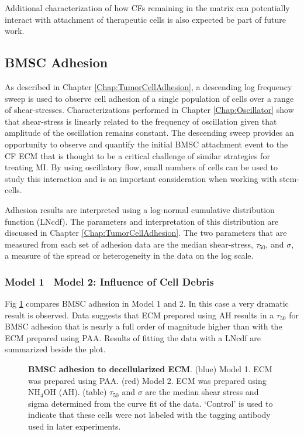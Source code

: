 Additional characterization of how CFs remaining in the matrix can potentially interact with attachment of therapeutic cells is also expected be part of future work.

\subsection{BMSC Adhesion}
As described in Chapter \ref{Chap:TumorCellAdhesion}, a descending log frequency sweep is used to observe cell adhesion of a single population of cells over a range of shear-stresses. Characterizations performed in Chapter \ref{Chap:Oscillator} show that shear-stress is linearly related to the frequency of oscillation given that amplitude of the oscillation remains constant. The descending sweep provides an opportunity to observe and quantify the initial BMSC attachment event to the CF ECM that is thought to be a critical challenge of similar strategies for treating MI. By using oscillatory flow, small numbers of cells can be used to study this interaction and is an important consideration when working with stem-cells.

Adhesion results are interpreted using a log-normal cumulative distribution function (LNcdf). The parameters and interpretation of this distribution are discussed in Chapter \ref{Chap:TumorCellAdhesion}. The two parameters that are measured from each set of adhesion data are the median shear-stress, $\tau_{50}$, and $\sigma$, a measure of the spread or heterogeneity in the data on the log scale.

\subsubsection{Model 1 \vs\ Model 2: Influence of Cell Debris}
Fig \ref{Chap:Cardiac:fig:1v2} compares BMSC adhesion in Model 1 and 2. In this case a very dramatic result is observed. Data suggests that ECM prepared using AH results in a $\tau_{50}$ for BMSC adhesion that is nearly a full order of magnitude higher than with the ECM prepared using PAA. Results of fitting the data with a LNcdf are summarized beside the plot.
\begin{figure}[!t]
\centering
{}
\caption{\textbf{BMSC adhesion to decellularized ECM}. (blue) Model 1. ECM was prepared using PAA. (red) Model 2. ECM was prepared using NH$_{4}$OH (AH). (table) $\tau_{50}$ and $\sigma$ are the median shear stress and sigma determined from the curve fit of the data. `Control' is used to indicate that these cells were not labeled with the tagging antibody used in later experiments.}
\label{Chap:Cardiac:fig:1v2}
\end{figure}

